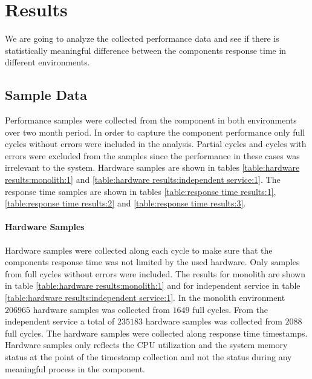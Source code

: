 \chapter{Results\label{results}}
We are going to analyze the collected performance data and see if there is statistically meaningful difference between the components response time in different environments.

\section{Sample Data}
Performance samples were collected from the component in both environments over two month period.
In order to capture the component performance only full cycles without errors were included in the analysis.
Partial cycles and cycles with errors were excluded from the samples since the performance in these cases was irrelevant to the system.
Hardware samples are shown in tables \ref{table:hardware results:monolith:1} and \ref{table:hardware results:independent service:1}.
The response time samples are shown in tables \ref{table:response time results:1}, \ref{table:response time results:2} and \ref{table:response time results:3}.

\subsubsection{Hardware Samples}
Hardware samples were collected along each cycle to make sure that the components response time was not limited by the used hardware.
Only samples from full cycles without errors were included.
The results for monolith are shown in table \ref{table:hardware results:monolith:1} and for independent service in table \ref{table:hardware results:independent service:1}.
In the monolith environment $206965$ hardware samples was collected from $1649$ full cycles.
From the independent service a total of $235183$ hardware samples was collected from $2088$ full cycles.
The hardware samples were collected along response time timestamps.
Hardware samples only reflects the CPU utilization and the system memory status at the point of the timestamp collection and not the status during any meaningful process in the component.

